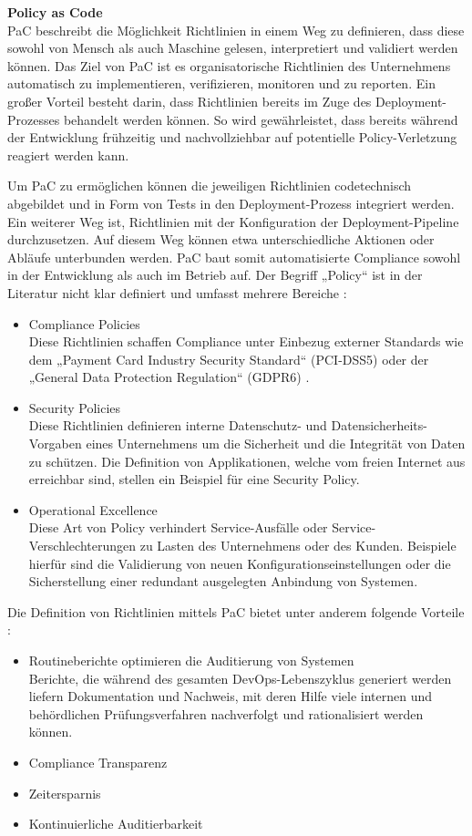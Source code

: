 \bigbreak
\textbf{Policy as Code}\\
PaC beschreibt die Möglichkeit Richtlinien in einem Weg zu definieren, dass diese sowohl von Mensch als auch Maschine gelesen, interpretiert und validiert werden können.
Das Ziel von PaC ist es organisatorische Richtlinien des Unternehmens automatisch zu implementieren, verifizieren, monitoren und zu reporten. Ein großer Vorteil besteht darin, dass Richtlinien bereits im Zuge des Deployment-Prozesses behandelt werden können. So wird gewährleistet, dass bereits während der Entwicklung frühzeitig und nachvollziehbar auf potentielle Policy-Verletzung reagiert werden kann.

Um PaC zu ermöglichen können die jeweiligen Richtlinien codetechnisch abgebildet und in Form von Tests in den Deployment-Prozess integriert werden. Ein weiterer Weg ist, Richtlinien mit der Konfiguration der Deployment-Pipeline durchzusetzen. Auf diesem Weg können etwa unterschiedliche Aktionen oder Abläufe unterbunden werden. PaC baut somit automatisierte Compliance sowohl in der Entwicklung als auch im Betrieb auf.
Der Begriff „Policy“ ist in der Literatur nicht klar definiert und umfasst mehrere Bereiche \autocite{dadgar}:
\begin{itemize}
    \item Compliance Policies\\
    Diese Richtlinien schaffen Compliance unter Einbezug externer Standards wie
    dem „Payment Card Industry Security Standard“ (PCI-DSS5) oder der „General Data Protection Regulation“ (GDPR6) \autocite{PCIDSS5} \autocite{GDPR}.
    \item Security Policies\\
    Diese Richtlinien definieren interne Datenschutz- und Datensicherheits-Vorgaben eines Unternehmens um die Sicherheit und die Integrität von Daten zu schützen. Die Definition von Applikationen, welche vom freien Internet aus erreichbar sind, stellen ein Beispiel für eine Security Policy.
    \item Operational Excellence\\
    Diese Art von Policy verhindert Service-Ausfälle oder Service-Verschlechterungen zu Lasten des Unternehmens oder des Kunden. Beispiele hierfür sind die Validierung von neuen Konfigurationseinstellungen oder die Sicherstellung einer redundant ausgelegten Anbindung von Systemen.
\end{itemize}
\bigbreak
Die Definition von Richtlinien mittels PaC bietet unter anderem folgende Vorteile \autocite{hackernoon_2020}:
\begin{itemize}
    \item Routineberichte optimieren die Auditierung von Systemen\\
    Berichte, die während des gesamten DevOps-Lebenszyklus generiert werden liefern Dokumentation und Nachweis, mit deren Hilfe viele internen und behördlichen Prüfungsverfahren nachverfolgt und rationalisiert werden können.
    \item Compliance Transparenz
    \item Zeitersparnis
    \item Kontinuierliche Auditierbarkeit
\end{itemize}

